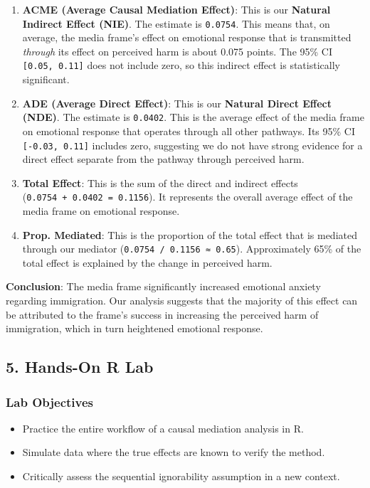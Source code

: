 \documentclass[
  10pt,
  letterpaper,
  DIV=11,
  numbers=noendperiod,
  oneside]{scrartcl}
\providecommand{\tightlist}{%
  \setlength{\itemsep}{0pt}\setlength{\parskip}{0pt}}
\begin{document}
\begin{enumerate}
\def\labelenumi{\arabic{enumi}.}
\tightlist
\item
  \textbf{ACME (Average Causal Mediation Effect)}: This is our
  \textbf{Natural Indirect Effect (NIE)}. The estimate is
  \texttt{0.0754}. This means that, on average, the media frame's effect
  on emotional response that is transmitted \emph{through} its effect on
  perceived harm is about 0.075 points. The 95\% CI
  \texttt{{[}0.05,\ 0.11{]}} does not include zero, so this indirect
  effect is statistically significant.
\item
  \textbf{ADE (Average Direct Effect)}: This is our \textbf{Natural
  Direct Effect (NDE)}. The estimate is \texttt{0.0402}. This is the
  average effect of the media frame on emotional response that operates
  through all other pathways. Its 95\% CI \texttt{{[}-0.03,\ 0.11{]}}
  includes zero, suggesting we do not have strong evidence for a direct
  effect separate from the pathway through perceived harm.
\item
  \textbf{Total Effect}: This is the sum of the direct and indirect
  effects (\texttt{0.0754\ +\ 0.0402\ =\ 0.1156}). It represents the
  overall average effect of the media frame on emotional response.
\item
  \textbf{Prop. Mediated}: This is the proportion of the total effect
  that is mediated through our mediator
  (\texttt{0.0754\ /\ 0.1156\ ≈\ 0.65}). Approximately 65\% of the total
  effect is explained by the change in perceived harm.
\end{enumerate}

\textbf{Conclusion}: The media frame significantly increased emotional
anxiety regarding immigration. Our analysis suggests that the majority
of this effect can be attributed to the frame's success in increasing
the perceived harm of immigration, which in turn heightened emotional
response.

\subsection{5. Hands-On R Lab}\label{hands-on-r-lab}

\subsubsection{Lab Objectives}\label{lab-objectives}

\begin{itemize}
\tightlist
\item
  Practice the entire workflow of a causal mediation analysis in R.
\item
  Simulate data where the true effects are known to verify the method.
\item
  Critically assess the sequential ignorability assumption in a new
  context.
\end{itemize}
\end{document}
